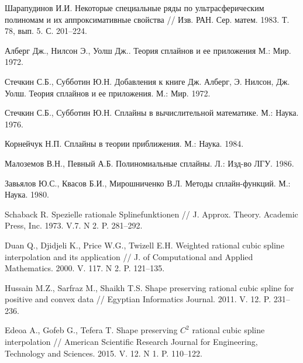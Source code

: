 \begin{thebibliography}{999}
 Шарапудинов И.И. Некоторые специальные ряды по ультрасферическим полиномам и их аппроксимативные свойства // Изв. РАН. Сер. матем. 1983. Т. 78, вып. 5. С. 201--224.



  Алберг Дж., Нилсон Э., Уолш Дж.. Теория сплайнов и ее приложения  М.: Мир. 1972.




  Стечкин С.Б., Субботин Ю.Н. Добавления к книге Дж. Алберг, Э. Нилсон, Дж. Уолш.
 Теория сплайнов и ее приложения.  М.: Мир. 1972.




 Стечкин С.Б., Субботин Ю.Н.  Сплайны в вычислительной математике. М.:  Наука. 1976.




  Корнейчук Н.П.  Сплайны в теории приближения. М.:  Наука. 1984.





  Малоземов В.Н., Певный А.Б. Полиномиальные сплайны. Л.: Изд-во ЛГУ. 1986.




 Завьялов Ю.С., Квасов Б.И., Мирошниченко В.Л.  Методы сплайн-функций.  М.: Наука. 1980.





 Schaback R. Spezielle rationale Splinefunktionen //  J. Approx. Theory. Academic Press, Inc. 1973. V.7. N 2. P. 281--292.




  Duan Q., Djidjeli K., Price W.G., Twizell E.H.  Weighted rational  cubic spline interpolation and its application // J. of Computational and Applied Mathematics. 2000. V. 117. N 2. P. 121--135.




  Hussain M.Z., Sarfraz M., Shaikh T.S.  Shape preserving rational cubic spline for positive and convex data // Egyptian Informatics Journal. 2011. V. 12. P. 231--236.




  Edeoa A., Gofeb G., Tefera T.  Shape preserving $C^2$ rational cubic spline interpolation //  American Scientific Research Journal for Engineering, Technology and Sciences. 2015. V. 12. N 1. P. 110--122.




\end{thebibliography}
